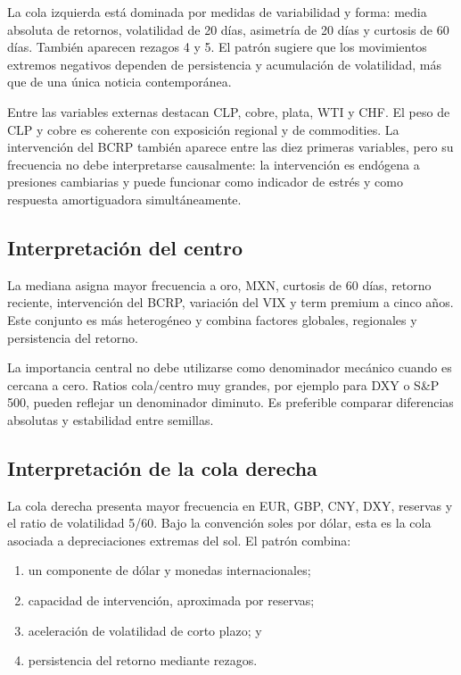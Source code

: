 \documentclass[11pt,a4paper]{article}
\begin{document}
La cola izquierda está dominada por medidas de variabilidad y forma:
media absoluta de retornos, volatilidad de 20 días, asimetría de 20 días y
curtosis de 60 días. También aparecen rezagos 4 y 5. El patrón sugiere que
los movimientos extremos negativos dependen de persistencia y acumulación de
volatilidad, más que de una única noticia contemporánea.

Entre las variables externas destacan CLP, cobre, plata, WTI y CHF. El peso
de CLP y cobre es coherente con exposición regional y de commodities. La
intervención del BCRP también aparece entre las diez primeras variables,
pero su frecuencia no debe interpretarse causalmente: la intervención es
endógena a presiones cambiarias y puede funcionar como indicador de estrés y
como respuesta amortiguadora simultáneamente.

\subsection{Interpretación del centro}

La mediana asigna mayor frecuencia a oro, MXN, curtosis de 60 días, retorno
reciente, intervención del BCRP, variación del VIX y term premium a cinco
años. Este conjunto es más heterogéneo y combina factores globales,
regionales y persistencia del retorno.

La importancia central no debe utilizarse como denominador mecánico cuando
es cercana a cero. Ratios cola/centro muy grandes, por ejemplo para DXY o
S\&P 500, pueden reflejar un denominador diminuto. Es preferible comparar
diferencias absolutas y estabilidad entre semillas.

\subsection{Interpretación de la cola derecha}

La cola derecha presenta mayor frecuencia en EUR, GBP, CNY, DXY, reservas y
el ratio de volatilidad 5/60. Bajo la convención soles por dólar, esta es la
cola asociada a depreciaciones extremas del sol. El patrón combina:

\begin{enumerate}[leftmargin=*]
  \item un componente de dólar y monedas internacionales;
  \item capacidad de intervención, aproximada por reservas;
  \item aceleración de volatilidad de corto plazo; y
  \item persistencia del retorno mediante rezagos.
\end{enumerate}
\end{document}
